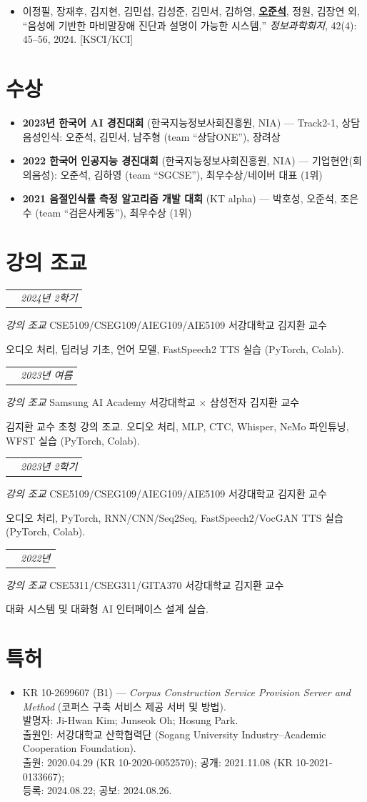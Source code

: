 \documentclass[a4paper,9pt]{extarticle}
\makeatletter
\newlength{\cvdatewidth}
\newenvironment{blockitems}{%
  \begin{itemize}[leftmargin=1.5em, itemsep=7pt, topsep=4pt, parsep=0pt, partopsep=0pt]
}{%
  \end{itemize}
}
\newcommand{\entrytitle}[1]{{\fontsize{10.5}{13}\selectfont\bfseries #1}}
\newcommand{\me}[1]{\textbf{\underline{#1}}}
\newcommand{\teachingentry}[5]{%
  \vspace{0.55em}
  \noindent
  \begin{tabularx}{\textwidth}{@{}>{\raggedright\arraybackslash}X >{\raggedleft\arraybackslash}p{\cvdatewidth}@{}}
    \entrytitle{#1} & \textit{#2} \\
  \end{tabularx}
  \noindent\textit{#3} \textbar{} #4\par
  \noindent #5\par
  \vspace{0.35em}
}
\makeatother
\begin{document}
\begin{blockitems}
  \item 이정필, 장재후, 김지현, 김민섭, 김성준, 김민서, 김하영, \me{오준석}, 정원, 김장연 외, ``음성에 기반한 마비말장애 진단과 설명이 가능한 시스템,'' \textit{정보과학회지}, 42(4): 45--56, 2024. [KSCI/KCI]
\end{blockitems}

\section*{수상}
\begin{blockitems}
  \item \textbf{2023년 한국어 AI 경진대회} (한국지능정보사회진흥원, NIA) --- Track2-1, 상담 음성인식: 오준석, 김민서, 남주형 (team ``상담ONE''), 장려상
  \item \textbf{2022 한국어 인공지능 경진대회} (한국지능정보사회진흥원, NIA) --- 기업현안(회의음성): 오준석, 김하영 (team ``SGCSE''), 최우수상/네이버 대표 (1위)
  \item \textbf{2021 음절인식률 측정 알고리즘 개발 대회} (KT alpha) --- 박호성, 오준석, 조은수 (team ``검은사케동''), 최우수상 (1위)
\end{blockitems}

\section*{강의 조교}
\teachingentry{생성형 AI 기반 오디오인식 및 합성/변환}{2024년 2학기}{강의 조교}{CSE5109/CSEG109/AIEG109/AIE5109 \textbar{} 서강대학교 \textbar{} 김지환 교수}{오디오 처리, 딥러닝 기초, 언어 모델, FastSpeech2 TTS 실습 (PyTorch, Colab).}
\teachingentry{딥러닝 기반 자동 음성 인식}{2023년 여름}{강의 조교}{Samsung AI Academy \textbar{} 서강대학교 $\times$ 삼성전자 \textbar{} 김지환 교수}{김지환 교수 초청 강의 조교. 오디오 처리, MLP, CTC, Whisper, NeMo 파인튜닝, WFST 실습 (PyTorch, Colab).}
\teachingentry{오디오인식 및 합성변환}{2023년 2학기}{강의 조교}{CSE5109/CSEG109/AIEG109/AIE5109 \textbar{} 서강대학교 \textbar{} 김지환 교수}{오디오 처리, PyTorch, RNN/CNN/Seq2Seq, FastSpeech2/VocGAN TTS 실습 (PyTorch, Colab).}
\teachingentry{대화형 사용자 인터페이스개론}{2022년}{강의 조교}{CSE5311/CSEG311/GITA370 \textbar{} 서강대학교 \textbar{} 김지환 교수}{대화 시스템 및 대화형 AI 인터페이스 설계 실습.}

\section*{특허}
\begin{blockitems}
  \item KR 10-2699607 (B1) --- \textit{Corpus Construction Service Provision Server and Method} (코퍼스 구축 서비스 제공 서버 및 방법).\\
  발명자: Ji-Hwan Kim; Junseok Oh; Hosung Park.\\
  출원인: 서강대학교 산학협력단 (Sogang University Industry--Academic Cooperation Foundation).\\
  출원: 2020.04.29 (KR 10-2020-0052570); 공개: 2021.11.08 (KR 10-2021-0133667);\\
  등록: 2024.08.22; 공보: 2024.08.26.
\end{blockitems}
\end{document}
